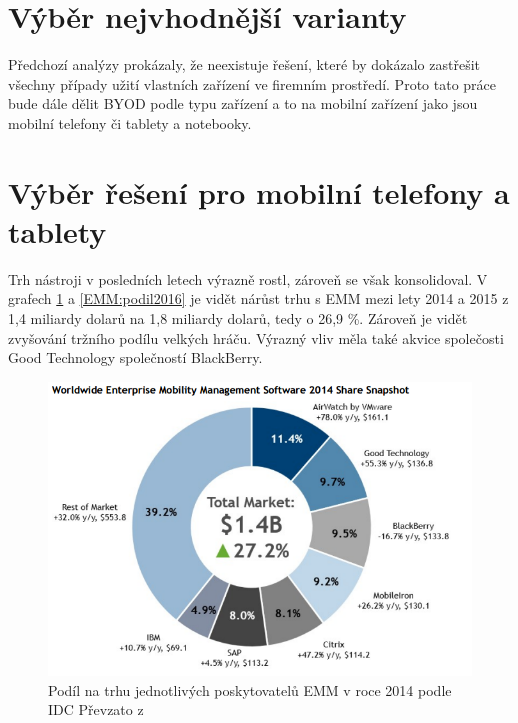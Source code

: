 \section{Výběr nejvhodnější varianty}

Předchozí analýzy prokázaly, že neexistuje řešení, které by dokázalo zastřešit všechny případy užití vlastních zařízení ve firemním prostředí. Proto tato práce bude dále dělit BYOD podle typu zařízení a to na mobilní zařízení jako jsou mobilní telefony či tablety a notebooky.

\section{Výběr řešení pro mobilní telefony a tablety}


Trh nástroji v posledních letech výrazně rostl, zároveň se však konsolidoval.  V grafech \ref{EMM:podil2015} a \ref{EMM:podil2016} je vidět nárůst trhu s EMM mezi lety 2014 a 2015 z 1,4 miliardy dolarů na 1,8 miliardy dolarů, tedy o 26,9 \%. Zároveň je vidět zvyšování tržního podílu velkých hráču. Výrazný vliv měla také akvice společosti Good Technology společností BlackBerry.

 
  \begin{figure}[h!]
\includegraphics[width=13cm]{img/IDC_EMM}
\caption{Podíl na trhu jednotlivých poskytovatelů EMM v roce 2014 podle IDC Převzato z \cite{}} 
\label{EMM:podil2015}
\centering
\end{figure}

